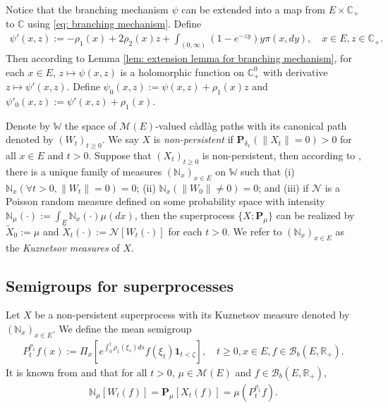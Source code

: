 \documentclass[12pt,a4paper]{amsart}
\theoremstyle{plain}
\theoremstyle{definition}
\numberwithin{equation}{section}
\begin{document}
Notice that the branching mechanism $\psi$ can be extended into a map from $E \times \mathbb C_+$ to $\mathbb C$ using \eqref{eq: branching mechanism}.
Define
\begin{align}
  \psi'(x,z)
  := - \rho_1(x) + 2\rho_2(x) z + \int_{(0,\infty)} (1-e^{-zy})y\pi(x,dy),
  \quad x\in E, z\in \mathbb C_+.
\end{align}
Then according to Lemma \ref{lem: extension lemma for branching mechanism}, for each $x \in E$, $z \mapsto \psi(x,z)$ is a holomorphic function on $\mathbb C_+^0$ with derivative $z \mapsto \psi'(x,z)$.
Define $\psi_0(x,z) := \psi(x,z)+ \rho_1(x)z $ and $\psi'_0(x,z) := \psi'(x,z) + \rho_1(x)$.

Denote by $\mathbb W$ the space of $\mathcal M(E)$-valued c\`{a}dl\`{a}g paths with its canonical path denoted by $(W_t)_{t\geq 0}$.
We say $X$ is \emph{non-persistent} if $\mathbf P_{\delta_x}(\|X_t\|= 0) > 0$ for all $x\in E$ and $t> 0$.
Suppose that $(X_t)_{t\geq 0}$ is non-persistent, then according to \cite[Section 8.4]{Li2011Measure-valued}, there is a unique family of measures $(\mathbb N_x)_{x\in E}$ on $\mathbb W$ such that
(i) $\mathbb N_x (\forall t > 0, \|W_t\|=0) =0$;
(ii) $\mathbb N_x(\|W_0 \|\neq 0) = 0$;
and (iii) if $\mathcal N$ is a Poisson random measure defined on some probability space with intensity $\mathbb N_\mu(\cdot):= \int_E \mathbb N_x(\cdot )\mu(dx)$, then the superprocess $\{X;\mathbf P_\mu\}$ can be realized by $\widetilde X_0 := \mu$ and $\widetilde X_t(\cdot) := \mathcal N[W_t(\cdot)]$ for each $t>0$.
We refer to $(\mathbb N_x)_{x\in E}$ as the \emph{Kuznetsov measures} of $X$.

\subsection{Semigroups for superprocesses}
\label{sec: definition of vf}
Let $X$ be a non-persistent superprocess with its Kuznetsov measure denoted by $(\mathbb N_x)_{x\in E}$.
We define the mean semigroup
\begin{align}
  P_t^{\rho_1} f(x)
  := \Pi_{x}[e^{\int_0^t \rho_1(\xi_s)ds}f(\xi_t) \mathbf 1_{t< \zeta}],
  \quad t\geq 0, x\in E, f\in \mathcal B_b(E,\mathbb R_+).
\end{align}
It is known from \cite[Proposition 2.27]{Li2011Measure-valued} and \cite[Theorem 2.7]{Kyprianou2014Fluctuations} that for all $t > 0$, $\mu \in \mathcal M(E)$ and $f\in \mathcal B_b(E,\mathbb R_+)$,
\begin{align}
  \label{eq: mean formula for superprocesses}
  \mathbb N_{\mu}[W_t(f)]
  =\mathbf P_{\mu}[X_t(f)]
  =\mu(P^{\rho_1}_t f).
\end{align}
\end{document}
